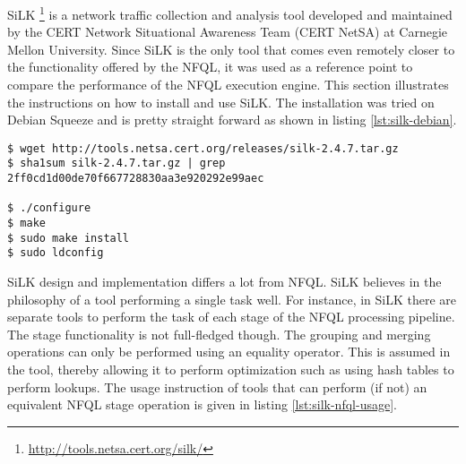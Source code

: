 SiLK \footnote{\url{http://tools.netsa.cert.org/silk/}} is a network traffic
collection and analysis tool developed and maintained by the CERT Network
Situational Awareness Team (CERT NetSA) at Carnegie Mellon University.  Since
SiLK is the only tool that comes even remotely closer to the functionality
offered by the \ac{NFQL}, it was used as a reference point to compare the
performance of the \ac{NFQL} execution engine. This section illustrates the
instructions on how to install and use SiLK. The installation was tried on
Debian Squeeze and is pretty straight forward as shown in listing
\ref{lst:silk-debian}.

\begin{lstlisting}
$ wget http://tools.netsa.cert.org/releases/silk-2.4.7.tar.gz
$ sha1sum silk-2.4.7.tar.gz | grep 2ff0cd1d00de70f667728830aa3e920292e99aec

$ ./configure
$ make
$ sudo make install
$ sudo ldconfig
\end{lstlisting}

SiLK design and implementation differs a lot from \ac{NFQL}. SiLK believes in
the philosophy of a tool performing a single task well. For instance, in SiLK
there are separate tools to perform the task of each stage of the \ac{NFQL}
processing pipeline. The stage functionality is not full-fledged though. The
grouping  and merging operations can
only be performed using an equality operator. This is assumed in the tool,
thereby allowing it to perform optimization such as using hash tables to
perform lookups. The usage instruction of tools that can perform (if not) an
equivalent \ac{NFQL} stage operation is given in listing
\ref{lst:silk-nfql-usage}.

